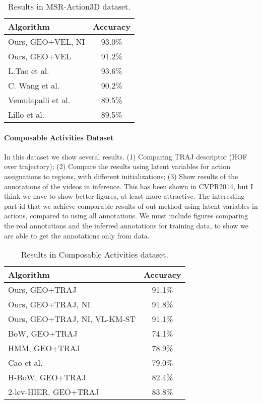 \begin{table}
\centering
\begin{tabular}{|l|c|}
\hline
\textbf{Algorithm} & \textbf{Accuracy}\\
\hline
Ours, GEO+VEL, NI &  93.0\% \\
Ours, GEO+VEL  & 91.2\% \\
\hline
L.Tao et al. \cite{Tao2015} & 93.6\% \\
C. Wang et al.\cite{Wang2013} &    90.2\% \\
Vemulapalli et al. \cite{vemulapalli2014human} & 89.5\% \\
Lillo et al. \cite{Lillo2014} & 89.5\%\\
\hline
\end{tabular}
\caption{Results in MSR-Action3D dataset. }
\end{table}

\paragraph{Composable Activities Dataset} In this dataset we show several results. (1) Comparing TRAJ descriptor (HOF over trajectory); (2) Compare the results using latent variables for action assignations to regions, with different initializations; (3) Show results of the annotations of the videos in inference. This has been shown in CVPR2014, but I think we have to show better figures, at least more attractive. The interesting part id that we achieve comparable results of out method using latent variables in actions, compared to using all annotations. We must include figures comparing the real annotations and the inferred annotations for training data, to show we are able to get the annotations only from data.

\begin{table}
\centering
\begin{tabular}{|l|c|}
\hline
\textbf{Algorithm} & \textbf{Accuracy}\\
\hline
Ours, GEO+TRAJ &  91.1\% \\
Ours, GEO+TRAJ, NI  & 91.8\% \\
Ours, GEO+TRAJ, NI, VL-KM-ST   & 91.1\% \\
\hline
BoW, GEO+TRAJ & 74.1\%    \\
HMM, GEO+TRAJ & 78.9\%  \\
Cao et al. \cite{cao2015spatio} & 79.0\% \\
H-BoW, GEO+TRAJ & 82.4\%   \\
2-lev-HIER, GEO+TRAJ & 83.8\%  \\
\hline
\end{tabular}
\caption{Results in Composable Activities dataset. }
\end{table}

